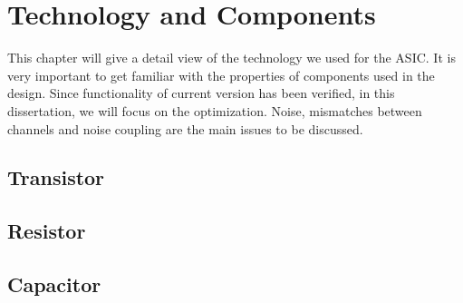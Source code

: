 \chapter{Technology and Components}
\par This chapter will give a detail view of the technology we used for the ASIC. It is very important to get familiar with the properties of components used in the design. Since functionality of current version has been verified, in this dissertation, we will focus on the optimization. Noise, mismatches between channels and noise coupling are the main issues to be discussed.

\section{Transistor}

\section{Resistor}

\section{Capacitor}